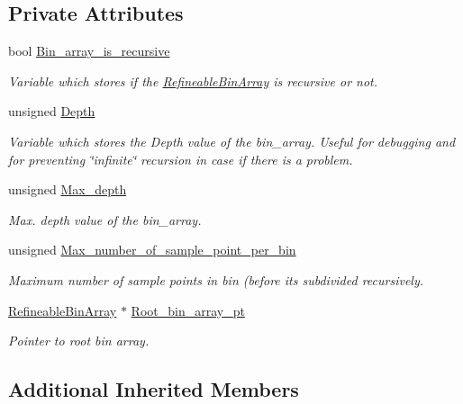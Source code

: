 \subsection*{Private Attributes}
\begin{DoxyCompactItemize}
\item 
bool \hyperlink{classoomph_1_1RefineableBinArrayParameters_a1f0e523056c7a2aed792b0fabeb06bda}{Bin\+\_\+array\+\_\+is\+\_\+recursive}
\begin{DoxyCompactList}\small\item\em Variable which stores if the \hyperlink{classRefineableBinArray}{Refineable\+Bin\+Array} is recursive or not. \end{DoxyCompactList}\item 
unsigned \hyperlink{classoomph_1_1RefineableBinArrayParameters_a298bbaa33862244e5c153c07da29636c}{Depth}
\begin{DoxyCompactList}\small\item\em Variable which stores the Depth value of the bin\+\_\+array. Useful for debugging and for preventing \char`\"{}infinite\char`\"{} recursion in case if there is a problem. \end{DoxyCompactList}\item 
unsigned \hyperlink{classoomph_1_1RefineableBinArrayParameters_a31ec6c0f07ea4ce3b5d29ae3a9e8dc11}{Max\+\_\+depth}
\begin{DoxyCompactList}\small\item\em Max. depth value of the bin\+\_\+array. \end{DoxyCompactList}\item 
unsigned \hyperlink{classoomph_1_1RefineableBinArrayParameters_ad6bec286a43785726d81c0bcadcb75be}{Max\+\_\+number\+\_\+of\+\_\+sample\+\_\+point\+\_\+per\+\_\+bin}
\begin{DoxyCompactList}\small\item\em Maximum number of sample points in bin (before its subdivided recursively. \end{DoxyCompactList}\item 
\hyperlink{classRefineableBinArray}{Refineable\+Bin\+Array} $\ast$ \hyperlink{classoomph_1_1RefineableBinArrayParameters_ab4e2e5c03c4d3e725bd4f595b850bc2d}{Root\+\_\+bin\+\_\+array\+\_\+pt}
\begin{DoxyCompactList}\small\item\em Pointer to root bin array. \end{DoxyCompactList}\end{DoxyCompactItemize}
\subsection*{Additional Inherited Members}


